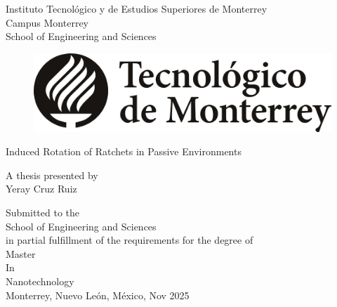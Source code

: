 \thispagestyle{empty} %

\begin{center}
\large { Instituto Tecnológico y de Estudios Superiores de Monterrey\\}
\vspace*{0.5em}
\normalsize { Campus Monterrey } \\
\vspace*{0.5em}
\large{School of Engineering and Sciences\\}
\vspace*{1em}

\begin{figure}[!h]
 \begin{center}
  \includegraphics[scale=0.2]{pics/LogoTec.jpg}
 \end{center}
\end{figure}
\vspace*{0.6cm}

\Large {Induced Rotation of Ratchets in Passive Environments}

\vspace*{0.5em}
\normalsize{A thesis presented by}\\
\vspace*{0.5em}
\large{Yeray Cruz Ruiz}\\
\vspace*{1.5cm}
\normalsize

Submitted to the\\
School of Engineering and Sciences\\
in partial fulfillment of the requirements for the degree of\\
\vspace*{1em}
\large{Master} \\
\large{In} \\
\large{Nanotechnology} \\
\normalsize
\vfill
Monterrey, Nuevo León, México, Nov 2025\\
\end{center}

\newpage %

